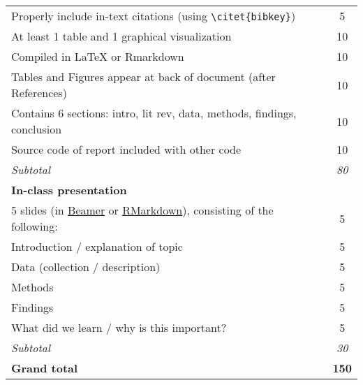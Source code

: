 \documentclass[12pt,english]{article}
\begin{document}
\begin{center}
{\begin{tabular}{l|c|c}
Properly include in-text citations (using \texttt{\textbackslash citet\{bibkey\}})           &               & 5                        \\
At least 1 table and 1 graphical visualization                                               &               & 10                       \\
Compiled in LaTeX or Rmarkdown                                                               &               & 10                       \\
Tables and Figures appear at back of document (after References)                             &               & 10                       \\
Contains 6 sections: intro, lit rev, data, methods, findings, conclusion                     &               & 10                       \\
Source code of report included with other code                                               &               & 10                       \\
\hline
\textit{Subtotal}                                                                            &               & \textit{80}              \\
\hline
\textbf{In-class presentation}                                                               &               &                          \\
5 slides (in \href{https://www.overleaf.com/learn/latex/Beamer}{Beamer} or \href{https://rmarkdown.rstudio.com/lesson-11.html}{RMarkdown}), consisting of the following: & & 5 \\
Introduction / explanation of topic                                                          &               & 5                        \\
Data (collection / description)                                                              &               & 5                        \\
Methods                                                                                      &               & 5                        \\
Findings                                                                                     &               & 5                        \\
What did we learn / why is this important?                                                   &               & 5                        \\
\hline
\textit{Subtotal}                                                                            &               & \textit{30}              \\
\hline
\textbf{Grand total}                                                                         &               & \textbf{150}            \\
\hline
\end{tabular}
}
\end{center}

\end{document}
